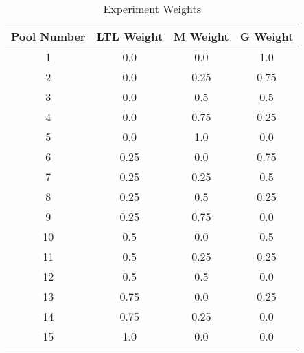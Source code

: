 \begin{table}[h!]
\centering
\begin{tabular}{|c|c|c|c|}
\hline
Pool Number & LTL Weight & M Weight & G Weight \\
\hline
1 & 0.0 & 0.0 & 1.0 \\ 
\hline
2 & 0.0 & 0.25 & 0.75 \\ 
\hline
3 & 0.0 & 0.5 & 0.5 \\ 
\hline
4 & 0.0 & 0.75 & 0.25 \\ 
\hline
5 & 0.0 & 1.0 & 0.0 \\ 
\hline
6 & 0.25 & 0.0 & 0.75 \\ 
\hline
7 & 0.25 & 0.25 & 0.5 \\ 
\hline
8 & 0.25 & 0.5 & 0.25 \\ 
\hline
9 & 0.25 & 0.75 & 0.0 \\ 
\hline
10 & 0.5 & 0.0 & 0.5 \\ 
\hline
11 & 0.5 & 0.25 & 0.25 \\ 
\hline
12 & 0.5 & 0.5 & 0.0 \\ 
\hline
13 & 0.75 & 0.0 & 0.25 \\ 
\hline
14 & 0.75 & 0.25 & 0.0 \\ 
\hline
15 & 1.0 & 0.0 & 0.0 \\ 
\hline
\end{tabular}
\caption{Experiment Weights}
\end{table}
